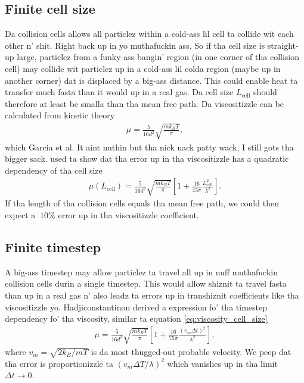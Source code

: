 \subsection{Finite cell size}
Da collision cells allows all particlez within a cold-ass lil cell ta collide wit each other n' shit. Right back up in yo muthafuckin ass. So if tha cell size is straight-up large, particlez from a funky-ass bangin' region (in one corner of tha collision cell) may collide wit particlez up in a cold-ass lil colda region (maybe up in another corner) dat is displaced by a big-ass distance. This could enable heat ta transfer much fasta than it would up in a real gas. Da cell size $L_\text{cell}$ should therefore at least be smalla than tha mean free path\cite{karniadakis2005microflows}. Da viscositizzle can be calculated from kinetic theory
\begin{align}
	\mu = \frac{5}{16d^2}\sqrt{\frac{mk_B T}{\pi}},
\end{align}
which Garcia et al. It aint nuthin but tha nick nack patty wack, I still gots tha bigger sack. \cite{alexander1998cell} used ta show dat tha error up in tha viscositizzle has a quadratic dependency of tha cell size
\begin{align}
	\label{eq:viscosity_cell_size}
	\mu(L_\text{cell}) = \frac{5}{16d^2}\sqrt{\frac{mk_B T}{\pi}} \left [1 + \frac{16}{45\pi}\frac{L_\text{cell}^2}{\lambda^2}\right].
\end{align}
If tha length of tha collision cells equals tha mean free path, we could then expect a $~10\%$ error up in tha viscositizzle coefficient.
\subsection{Finite timestep}
A big-ass timestep may allow particlez ta travel all up in nuff muthafuckin collision cells durin a single timestep. This would allow shiznit ta travel fasta than up in a real gas n' also leadz ta errors up in transhiznit coefficients like tha viscositizzle yo. Hadjiconstantinou \cite{hadjiconstantinou2000analysis} derived a expression fo' tha timestep dependency fo' tha viscosity, similar ta equation \eqref{eq:viscosity_cell_size}
\begin{align}
	\mu = \frac{5}{16d^2}\sqrt{\frac{mk_B T}{\pi}} \left [1 + \frac{16}{75\pi}\frac{(v_m\Delta t)^2}{\lambda^2}\right],
\end{align}
where $v_m=\sqrt{2k_B/mT}$ is da most thugged-out probable velocity. We peep dat tha error is proportionizzle ta $(v_m\Delta T/\lambda)^2$ which vanishes up in tha limit $\Delta t\rightarrow 0$. 